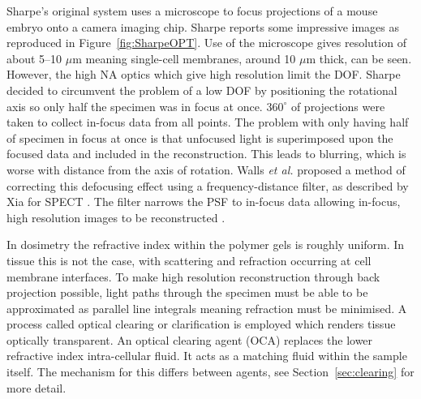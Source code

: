 	
	Sharpe's original system uses a microscope to focus projections of a mouse embryo onto a camera imaging chip.  Sharpe reports some impressive images as reproduced in Figure~\ref{fig:SharpeOPT}. Use of the microscope gives resolution of about 5--10 $\mu$m meaning single-cell membranes, around 10 $\mu$m thick, can be seen\cite{Sharpe:2002jp}. However, the high NA  optics which give high resolution limit the DOF. Sharpe decided to circumvent the problem of a low DOF by positioning the rotational axis so only half the specimen was in focus at once. $360^{\circ}$ of projections were taken to collect in-focus data from all points. The problem with only having half of specimen in focus at once is that unfocused light is superimposed upon the focused data and included in the reconstruction. This leads to blurring, which is worse with distance from the axis of rotation. Walls \textit{et al.} proposed a method of correcting this defocusing effect using a frequency-distance filter, as described by Xia for SPECT \cite{xia1995fourier,Walls:2007jl}. The filter narrows the PSF to in-focus data allowing in-focus, high resolution images to be reconstructed \cite{Walls:2007jl}.
	
	
	
	In dosimetry the refractive index within the polymer gels is roughly uniform. In tissue this is not the case, with scattering and refraction occurring at cell membrane interfaces. To make high resolution reconstruction through back projection possible, light paths through the specimen must be able to  be approximated as parallel line integrals meaning refraction must be minimised. A process called optical clearing or clarification is employed which renders tissue optically transparent. An optical clearing agent (OCA) replaces the lower refractive index intra-cellular fluid. It acts as a matching fluid within the sample itself. The mechanism for this differs between agents, see Section~\ref{sec:clearing} for more detail. 
	
	
	
	
	
